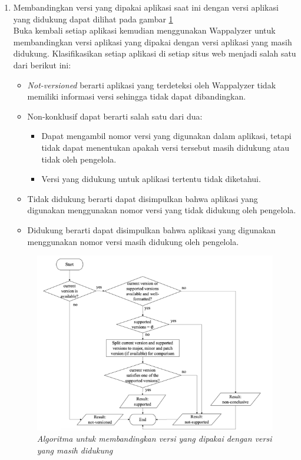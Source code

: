 \begin{enumerate}
    \item Membandingkan versi yang dipakai aplikasi saat ini dengan versi aplikasi yang didukung dapat dilihat pada gambar \ref{fig:apr}\\
    Buka kembali setiap aplikasi kemudian menggunakan Wappalyzer untuk membandingkan versi aplikasi yang dipakai dengan versi aplikasi yang masih didukung. Klasifikasikan setiap aplikasi di setiap situs web menjadi salah satu dari berikut ini:
    \begin{itemize}
        \item \textit{Not-versioned} berarti aplikasi yang terdeteksi oleh Wappalyzer tidak memiliki informasi versi sehingga tidak dapat dibandingkan.
        \item Non-konklusif dapat berarti salah satu dari dua:
        \begin{itemize}
            \item Dapat mengambil nomor versi yang digunakan dalam aplikasi, tetapi tidak dapat menentukan apakah versi tersebut masih didukung atau tidak oleh pengelola.
            \item Versi yang didukung untuk aplikasi tertentu tidak diketahui.
        \end{itemize}
        \item Tidak didukung berarti dapat disimpulkan bahwa aplikasi yang digunakan menggunakan nomor versi yang tidak didukung oleh pengelola.
        \item Didukung berarti dapat disimpulkan bahwa aplikasi yang digunakan menggunakan nomor versi masih didukung oleh pengelola.
    \end{itemize}
    \begin{figure}[H]
	\centering  
	\includegraphics[scale=0.9]{Gambar/compare_version.PNG}  
	\caption{\textit{Algoritma untuk membandingkan versi yang dipakai dengan versi yang masih didukung}} 
	\label{fig:apr} 
\end{figure}
\end{enumerate}


